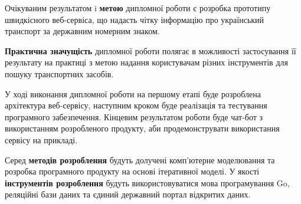Очікуваним результатом i \textbf{метою} дипломної роботи є розробка прототипу
швидкісного веб-сервіса, що надасть чітку інформацію про український транспорт
за державним номерним знаком.

\textbf{Практична значущість} дипломної роботи полягає в можливості
застосування її результату на практиці з метою надання користувачам різних
інструментів для пошуку транспортних засобів.

У ході виконання дипломної роботи на першому етапі буде розроблена
архітектура веб-сервісу, наступним кроком буде реалізація та тестування
програмного забезпечення.
Кінцевим результатом роботи буде чат-бот з використанням розробленого
продукту, аби продемонструвати використання сервісу на прикладі.

Серед \textbf{методів розроблення} будуть долучені комп’ютерне моделювання та розробка програмного
продукту на основі ітеративної моделі. У якості \textbf{інструментів розроблення} будуть використовуватися
мова програмування Go, реляційні бази даних та
єдиний державний портал відкритих даних.
